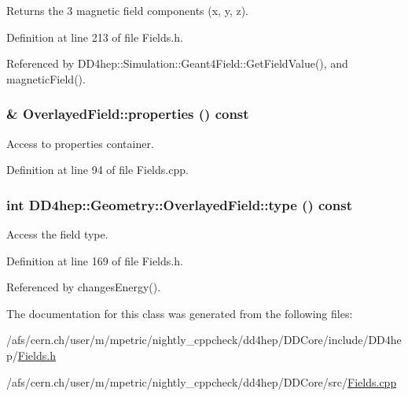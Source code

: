 Returns the 3 magnetic field components (x, y, z). 

Definition at line 213 of file Fields.h.

Referenced by DD4hep::Simulation::Geant4Field::GetFieldValue(), and magneticField().\hypertarget{class_d_d4hep_1_1_geometry_1_1_overlayed_field_ab62f0df6c7eeb974faa87e327f8bcdfb}{
\subsubsection[{properties}]{ \& OverlayedField::properties () const}}
\label{class_d_d4hep_1_1_geometry_1_1_overlayed_field_ab62f0df6c7eeb974faa87e327f8bcdfb}


Access to properties container. 

Definition at line 94 of file Fields.cpp.\hypertarget{class_d_d4hep_1_1_geometry_1_1_overlayed_field_a27ef8145f77b824398f5caf854a598b5}{
\subsubsection[{type}]{\setlength{\rightskip}{0pt plus 5cm}int DD4hep::Geometry::OverlayedField::type () const}}
\label{class_d_d4hep_1_1_geometry_1_1_overlayed_field_a27ef8145f77b824398f5caf854a598b5}


Access the field type. 

Definition at line 169 of file Fields.h.

Referenced by changesEnergy().

The documentation for this class was generated from the following files:\begin{DoxyCompactItemize}
\item 
/afs/cern.ch/user/m/mpetric/nightly\_\-cppcheck/dd4hep/DDCore/include/DD4hep/\hyperlink{_fields_8h}{Fields.h}\item 
/afs/cern.ch/user/m/mpetric/nightly\_\-cppcheck/dd4hep/DDCore/src/\hyperlink{_fields_8cpp}{Fields.cpp}\end{DoxyCompactItemize}
